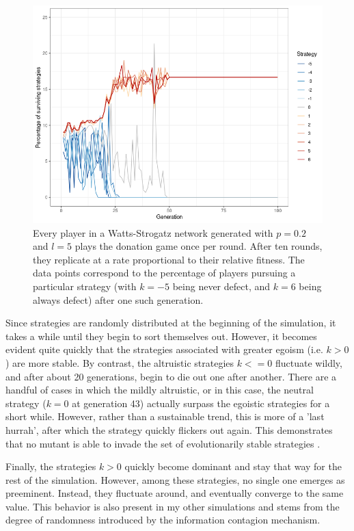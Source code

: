 \documentclass{JASSS}
\begin{document}
\begin{figure}
	\centering
	\includegraphics[width=\linewidth]{./figures/results_WS_N300_p02.png}
	\caption{Every player in a Watts-Strogatz network generated with $p=0.2$ and $l=5$ plays the donation game once per round. After ten rounds, they replicate at a rate proportional to their relative fitness. The data points correspond to the percentage of players pursuing a particular strategy (with $k=-5$ being never defect, and $k=6$ being always defect) after one such generation.}
	\label{WS_300_p_03}
\end{figure}

Since strategies are randomly distributed at the beginning of the simulation, it takes a while until they begin to sort themselves out. However, it becomes evident quite quickly that the strategies associated with greater egoism (i.e. $k>0$) are more stable. By contrast, the altruistic strategies $k<=0$ fluctuate wildly, and after about 20 generations, begin to die out one after another. There are a handful of cases in which the mildly altruistic, or in this case, the neutral strategy ($k=0$ at generation 43) actually surpass the egoistic strategies for a short while. However, rather than a sustainable trend, this is more of a 'last hurrah', after which the strategy quickly flickers out again. This demonstrates that no mutant is able to invade the set of evolutionarily stable strategies \citep{hamilton1964_2}.

Finally, the strategies $k>0$ quickly become dominant and stay that way for the rest of the simulation. However, among these strategies, no single one emerges as preeminent. Instead, they fluctuate around, and eventually converge to the same value. This behavior is also present in my other simulations and stems from the degree of randomness introduced by the information contagion mechanism.
\end{document}
